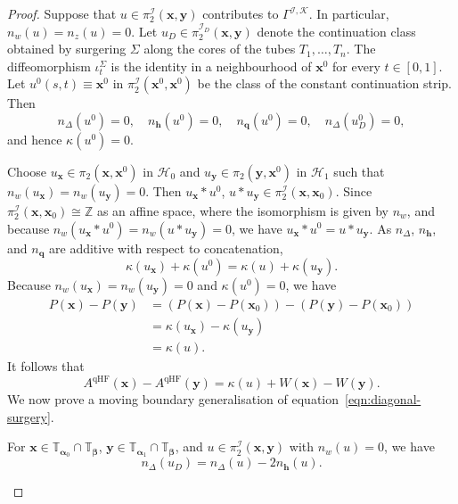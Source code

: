 \documentclass[11pt]{amsart}
\numberwithin{equation}{section}
\numberwithin{figure}{section}
\theoremstyle{definition}
\newcommand{\cH}{\mathcal{H}}
\newcommand{\cK}{\mathscr{K}}
\newcommand{\bT}{\mathbb{T}}
\newcommand{\bZ}{\mathbb{Z}}
\newcommand{\sI}{\mathscr{I}}
\DeclareMathOperator{\qHF}{qHF}
\newcommand{\as}{\boldsymbol{\alpha}}
\newcommand{\bs}{\boldsymbol{\beta}}
\newcommand{\hs}{\boldsymbol{h}}
\newcommand{\qs}{\boldsymbol{q}}
\newcommand{\xs}{\boldsymbol{x}}
\newcommand{\ys}{\boldsymbol{y}}
\begin{document}
\begin{proof}
    Suppose that $u \in \pi_2^{\sI}(\xs,\ys)$ contributes to $\Gamma^{\sI, \cK}$. In particular, $n_w(u) = n_z(u) = 0$. Let $u_D \in \pi_2^{\sI_D}(\xs,\ys)$ denote the continuation class obtained by surgering $\Sigma$ along the cores of the tubes $T_1,\dots,T_n$. The diffeomorphism $\iota_t^\Sigma$ is the identity in a neighbourhood of $\xs^0$ for every $t \in [0,1]$. Let $u^0(s,t) \equiv \xs^0$ in $\pi_2^\sI(\xs^0,\xs^0)$ be the class of the constant continuation strip. Then 
    \begin{equation}\label{eqn:constant-strip}
    n_\Delta(u^0) = 0, \quad n_{\hs}(u^0) = 0, \quad n_{\qs}(u^0) = 0, \quad n_\Delta(u^0_D) = 0, 
    \end{equation}
    and hence $\kappa(u^0) = 0$.
        
    Choose $u_{\xs} \in \pi_2(\xs,\xs^0)$ in $\cH_0$ and $u_{\ys} \in \pi_2(\ys,\xs^0)$ in $\cH_1$ such that $n_w(u_{\xs}) = n_w(u_{\ys}) = 0$. Then $u_{\xs} \ast u^0$, $u \ast u_{\ys} \in \pi_2^{\sI}(\xs,\xs_0)$. Since $\pi_2^{\sI}(\xs,\xs_0) \cong \bZ$ as an affine space, where the isomorphism is given by $n_w$, and because $n_w(u_{\xs} \ast u^0) = n_w(u \ast u_{\ys}) = 0$, we have $u_{\xs} \ast u^0 = u \ast u_{\ys}$. As $n_\Delta$, $n_{\hs}$, and $n_{\qs}$ are additive with respect to concatenation,
    \[
    \kappa(u_{\xs}) + \kappa(u^0) = \kappa(u) + \kappa(u_{\ys}).
    \]
    Because $n_w(u_{\xs}) = n_w(u_{\ys}) = 0$ and $\kappa(u^0) = 0$, we have 
    \begin{equation}\label{eqn:kappa-continuation}
    \begin{split}
    P(\xs) - P(\ys) &= (P(\xs)-P(\xs_0)) - (P(\ys)-P(\xs_0))\\
    &= \kappa(u_{\xs}) - \kappa(u_{\ys})\\
    &= \kappa(u).
    \end{split}
    \end{equation}
    It follows that
    \begin{equation}\label{eqn:qHF-continuation}
        A^{\qHF}(\xs) - A^{\qHF}(\ys) = \kappa(u) + W(\xs) - W(\ys).
    \end{equation}
    We now prove a moving boundary generalisation of equation~\eqref{eqn:diagonal-surgery}.

    \begin{lem}\label{lem:continuation-surgery}
        For $\xs \in \bT_{\as_0} \cap \bT_{\bs}$, $\ys \in \bT_{\as_1} \cap \bT_{\bs}$, and $u \in \pi_2^\sI(\xs,\ys)$ with $n_w(u) = 0$, we have
        \[
        n_\Delta(u_D) = n_\Delta(u) - 2n_{\hs}(u).
        \]
    \end{lem}


\end{proof}
\end{document}
